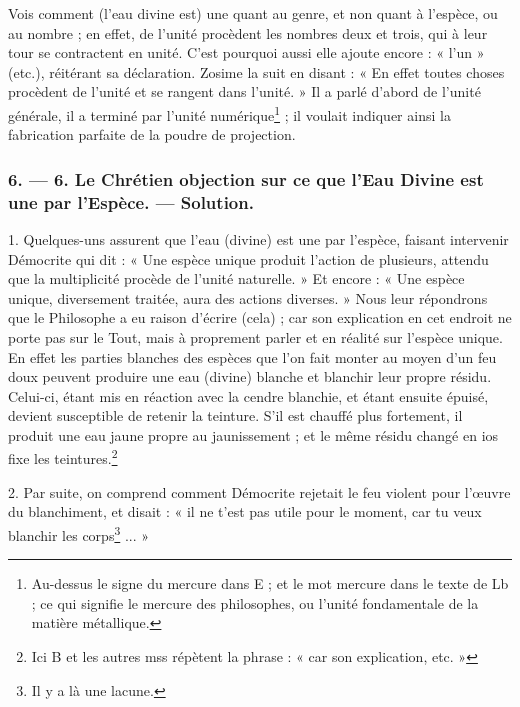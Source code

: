 \documentclass[a4paper, 11pt, oneside, polutonikogreek, french]{article}
\begin{document}
Vois comment (l'eau divine est) une quant au genre, et non quant à l'espèce, ou au nombre ; en effet, de l'unité procèdent les nombres deux et trois, qui à leur tour se contractent en unité. C'est pourquoi aussi elle ajoute encore : « l'un » (etc.), réitérant sa déclaration. Zosime la suit en disant : « En effet toutes choses procèdent de l'unité et se rangent dans l'unité. » Il a parlé d'abord de l'unité générale, il a terminé par l'unité numérique\footnote{Au-dessus le signe du mercure dans E ; et le mot mercure dans le texte de Lb ; ce qui signifie le mercure des philosophes, ou l'unité fondamentale de la matière métallique.} ; il voulait indiquer ainsi la fabrication parfaite de la poudre de projection.

\bigskip
\centerline{\EightStarTaper}
\centerline{\EightStarTaper\EightStarTaper}
\bigskip

\subsubsection{6. --- 6. Le Chrétien objection sur ce que l'Eau Divine est une par l'Espèce. --- Solution.}

1. Quelques-uns assurent que l'eau (divine) est une par l'espèce, faisant intervenir Démocrite qui dit : « Une espèce unique produit l'action de plusieurs, attendu que la multiplicité procède de l'unité naturelle. » Et encore : « Une espèce unique, diversement traitée, aura des actions diverses. » Nous leur répondrons que le Philosophe a eu raison d'écrire (cela) ; car son explication en cet endroit ne porte pas sur le Tout, mais à proprement parler et en réalité sur l'espèce unique. En effet les parties blanches des espèces que l'on fait monter au moyen d'un feu doux peuvent produire une eau (divine) blanche et blanchir leur propre résidu. Celui-ci, étant mis en réaction avec la cendre blanchie, et étant ensuite épuisé, devient susceptible de retenir la teinture. S'il est chauffé plus fortement, il produit une eau jaune propre au jaunissement ; et le même résidu changé en ios fixe les teintures.\footnote{Ici B et les autres mss répètent la phrase : « car son explication, etc. »}

2. Par suite, on comprend comment Démocrite rejetait le feu violent pour l'œuvre du blanchiment, et disait : « il ne t'est pas utile pour le moment, car tu veux blanchir les corps\footnote{Il y a là une lacune.} ... »
\end{document}
